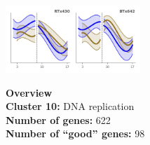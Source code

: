 \begin{multicols}{2}
\includegraphics[width=2in]{figures/clusters/leaf_Preflowering_9.png}
\columnbreak

\noindent \textbf{Overview}\\\textbf{Cluster 10:} DNA replication \\
\textbf{Number of genes:} 622 \\
\textbf{Number of ``good'' genes:} 98 \\
\end{multicols}

